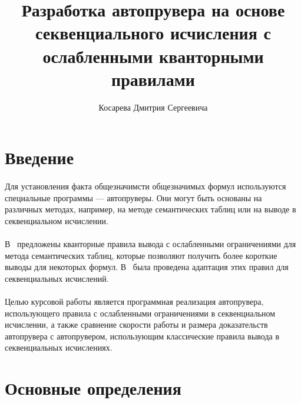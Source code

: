 \documentclass{cw1}
\begin{document}
 \sloppy

\title{Разработка автопрувера на основе секвенциального исчисления с
ослабленными кванторными правилами}

\author{Косарева Дмитрия Сергеевича}

\maketitle
\setcounter{page}{2}
\tableofcontents
\newpage


\section{Введение}
\paragraph{}
Для установления факта общезначимсти общезначимых формул используются специальные программы --- автопруверы.
Они могут быть основаны на различных методах, например, на методе семантических таблиц или
на выводе в секвенциальном исчислении.
\paragraph{}
В~\cite{hahnle} предложены кванторные правила вывода с ослабленными ограничениями для
метода семантических таблиц, которые позволяют получить более короткие выводы для некоторых формул.
В~\cite{konev} была проведена адаптация этих правил для секвенциальных исчислений.

\paragraph{}
Целью курсовой работы является
программная реализация автопрувера, использующего правила с ослабленными ограничениями в
секвенциальном исчислении, а также сравнение скорости работы и размера доказательств автопрувера
с автопрувером, использующим классические правила вывода в секвенциальных исчислениях.

\section{Основные определения}
\end{document}
